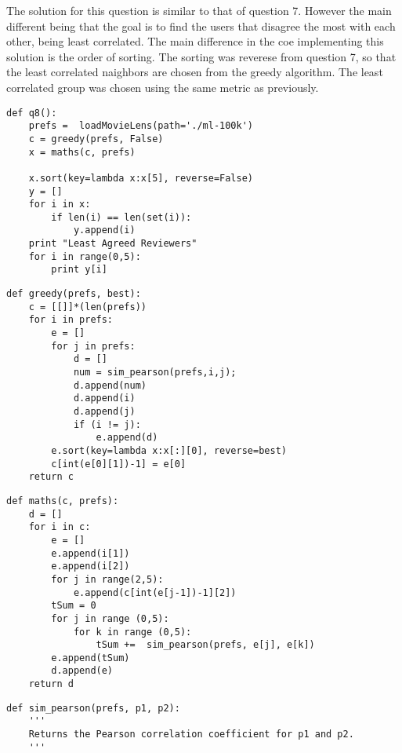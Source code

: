 \begin{flushleft}


The solution for this question is similar to that of question 7. However the main different being that the goal is to find the users that disagree the most with each other, being least correlated. The main difference in the coe implementing this solution is the order of sorting. The sorting was reverese from question 7, so that the least correlated naighbors are chosen from the greedy algorithm. The least correlated group was chosen using the same metric as previously.




\begin{lstlisting}[caption={Python code for question 8}]
def q8():
    prefs =  loadMovieLens(path='./ml-100k')
    c = greedy(prefs, False)
    x = maths(c, prefs)

    x.sort(key=lambda x:x[5], reverse=False)
    y = []
    for i in x:
        if len(i) == len(set(i)):
            y.append(i)
    print "Least Agreed Reviewers"
    for i in range(0,5):
        print y[i]
\end{lstlisting}

\begin{lstlisting}[caption={Greddy Algorithm for determining most correlated reviewer}]
def greedy(prefs, best):
    c = [[]]*(len(prefs))
    for i in prefs:
        e = []
        for j in prefs:
            d = []
            num = sim_pearson(prefs,i,j);
            d.append(num)
            d.append(i)
            d.append(j)
            if (i != j):
                e.append(d)
        e.sort(key=lambda x:x[:][0], reverse=best)
        c[int(e[0][1])-1] = e[0]       
    return c 
\end{lstlisting}


\begin{lstlisting}[caption={Determining chain of 5 reviewers from correlated}]
def maths(c, prefs):
    d = []
    for i in c:
        e = []
        e.append(i[1])
        e.append(i[2])
        for j in range(2,5):
            e.append(c[int(e[j-1])-1][2])
        tSum = 0
        for j in range (0,5):
            for k in range (0,5):
                tSum +=  sim_pearson(prefs, e[j], e[k])
        e.append(tSum)
        d.append(e)
    return d
\end{lstlisting}


\begin{lstlisting}[caption={Correlation between two reviewers}]
def sim_pearson(prefs, p1, p2):
    '''
    Returns the Pearson correlation coefficient for p1 and p2.
    '''


\end{lstlisting}
\end{flushleft}
